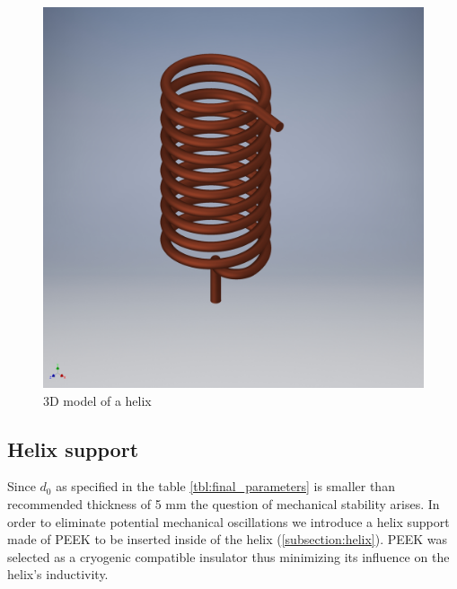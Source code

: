\begin{figure}[h]
	\centering
	\includegraphics[width=\textwidth]{images/coil}
	\caption{3D model of a helix}
	\label{fig:helix}
\end{figure}

\clearpage
\subsection{Helix support}
\label{subsection:helix_support}
Since $d_0$ as specified in the table \ref{tbl:final_parameters} is smaller than recommended thickness of 5 mm the question of mechanical stability arises. In order to eliminate potential mechanical oscillations we introduce a helix support made of PEEK to be inserted inside of the helix (\ref{subsection:helix}). PEEK was selected as a cryogenic compatible insulator thus minimizing its influence on the helix's inductivity.

